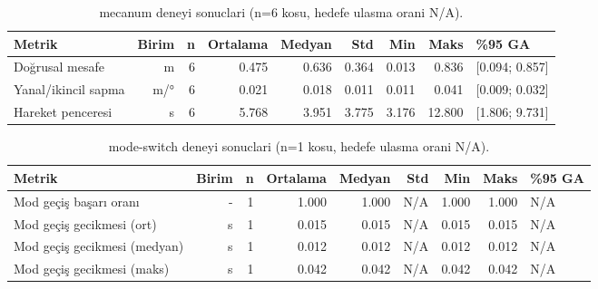 \begin{table}[htbp]
\centering
\caption{mecanum deneyi sonuclari (n=6 kosu, hedefe ulasma orani N/A).}
\label{tab:benchmark-mecanum}
\begin{tabular}{lrrrrrrrl}
\toprule
Metrik & Birim & n & Ortalama & Medyan & Std & Min & Maks & \%95 GA \\
\midrule
Doğrusal mesafe & m & 6 & 0.475 & 0.636 & 0.364 & 0.013 & 0.836 & [0.094; 0.857] \\
Yanal/ikincil sapma & m/° & 6 & 0.021 & 0.018 & 0.011 & 0.011 & 0.041 & [0.009; 0.032] \\
Hareket penceresi & s & 6 & 5.768 & 3.951 & 3.775 & 3.176 & 12.800 & [1.806; 9.731] \\
\bottomrule
\end{tabular}
\end{table}

\begin{table}[htbp]
\centering
\caption{mode-switch deneyi sonuclari (n=1 kosu, hedefe ulasma orani N/A).}
\label{tab:benchmark-mode-switch}
\begin{tabular}{lrrrrrrrl}
\toprule
Metrik & Birim & n & Ortalama & Medyan & Std & Min & Maks & \%95 GA \\
\midrule
Mod geçiş başarı oranı & - & 1 & 1.000 & 1.000 & N/A & 1.000 & 1.000 & N/A \\
Mod geçiş gecikmesi (ort) & s & 1 & 0.015 & 0.015 & N/A & 0.015 & 0.015 & N/A \\
Mod geçiş gecikmesi (medyan) & s & 1 & 0.012 & 0.012 & N/A & 0.012 & 0.012 & N/A \\
Mod geçiş gecikmesi (maks) & s & 1 & 0.042 & 0.042 & N/A & 0.042 & 0.042 & N/A \\
\bottomrule
\end{tabular}
\end{table}

